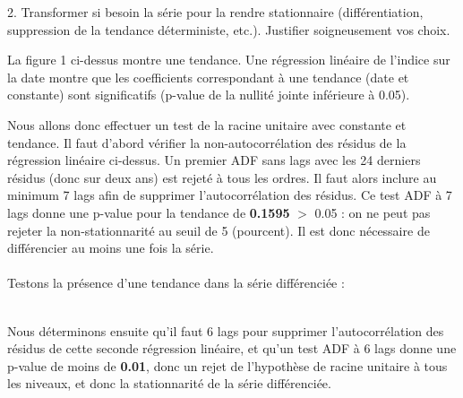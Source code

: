 \documentclass[a4paper, 12pt]{article} %
\begin{document}
\begin{tcolorbox}
{\small
2. Transformer si besoin la série pour la rendre stationnaire (différentiation, suppression de la tendance
déterministe, etc.). Justifier soigneusement vos choix.}
\end{tcolorbox}
{\normalsize
{La figure 1 ci-dessus montre une tendance. Une régression linéaire de l'indice sur la date montre que les coefficients correspondant à une tendance (date et constante) sont significatifs (p-value de la nullité jointe inférieure à 0.05). }}
\begin{table}[h]
    \centering
    \caption{Régression linéaire de l'indice sur la date}
\end{table}
{\normalsize
{Nous allons donc effectuer un test de la racine unitaire avec constante et tendance. Il faut d'abord vérifier la non-autocorrélation des résidus de la régression linéaire ci-dessus. Un premier ADF sans lags avec les 24 derniers résidus (donc sur deux ans) est rejeté à tous les ordres. Il faut alors inclure au minimum 7 lags afin de supprimer l'autocorrélation des résidus. \newline Ce test ADF à 7 lags donne une p-value pour la tendance de \textbf{0.1595} $>$ 0.05 : on ne peut pas rejeter la non-stationnarité au seuil de 5 (pourcent). Il est donc nécessaire de différencier au moins une fois la série.}}
\\ \\{\normalsize
{Testons la présence d'une tendance dans la série différenciée :}}
\begin{table}[h]
    \centering
    \caption{Régression linéaire de l'indice différencié sur la date}
\end{table}
{\normalsize
{\\Nous déterminons ensuite qu'il faut 6 lags pour supprimer l'autocorrélation des résidus de cette seconde régression linéaire, et qu'un test ADF à 6 lags donne une p-value de moins de \textbf{0.01}, donc un rejet de l'hypothèse de racine unitaire à tous les niveaux, et donc la stationnarité de la série différenciée.}}
\end{document}
